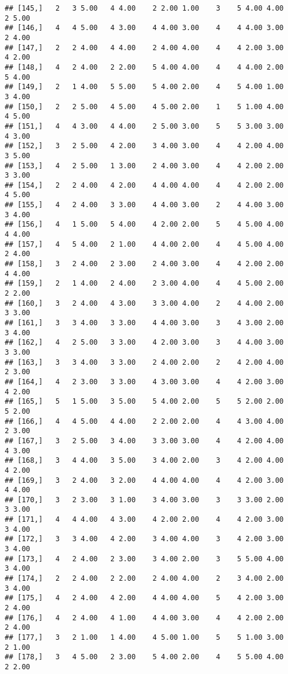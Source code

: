 \documentclass[]{article}
\begin{document}
\begin{verbatim}
## [145,]   2   3 5.00   4 4.00    2 2.00 1.00    3    5 4.00 4.00    2 5.00
## [146,]   4   4 5.00   4 3.00    4 4.00 3.00    4    4 4.00 3.00    2 4.00
## [147,]   2   2 4.00   4 4.00    2 4.00 4.00    4    4 2.00 3.00    4 2.00
## [148,]   4   2 4.00   2 2.00    5 4.00 4.00    4    4 4.00 2.00    5 4.00
## [149,]   2   1 4.00   5 5.00    5 4.00 2.00    4    5 4.00 1.00    3 4.00
## [150,]   2   2 5.00   4 5.00    4 5.00 2.00    1    5 1.00 4.00    4 5.00
## [151,]   4   4 3.00   4 4.00    2 5.00 3.00    5    5 3.00 3.00    4 3.00
## [152,]   3   2 5.00   4 2.00    3 4.00 3.00    4    4 2.00 4.00    3 5.00
## [153,]   4   2 5.00   1 3.00    2 4.00 3.00    4    4 2.00 2.00    3 3.00
## [154,]   2   2 4.00   4 2.00    4 4.00 4.00    4    4 2.00 2.00    4 5.00
## [155,]   4   2 4.00   3 3.00    4 4.00 3.00    2    4 4.00 3.00    3 4.00
## [156,]   4   1 5.00   5 4.00    4 2.00 2.00    5    4 5.00 4.00    4 4.00
## [157,]   4   5 4.00   2 1.00    4 4.00 2.00    4    4 5.00 4.00    2 4.00
## [158,]   3   2 4.00   2 3.00    2 4.00 3.00    4    4 2.00 2.00    4 4.00
## [159,]   2   1 4.00   2 4.00    2 3.00 4.00    4    4 5.00 2.00    2 2.00
## [160,]   3   2 4.00   4 3.00    3 3.00 4.00    2    4 4.00 2.00    3 3.00
## [161,]   3   3 4.00   3 3.00    4 4.00 3.00    3    4 3.00 2.00    3 4.00
## [162,]   4   2 5.00   3 3.00    4 2.00 3.00    3    4 4.00 3.00    3 3.00
## [163,]   3   3 4.00   3 3.00    2 4.00 2.00    2    4 2.00 4.00    2 3.00
## [164,]   4   2 3.00   3 3.00    4 3.00 3.00    4    4 2.00 3.00    4 2.00
## [165,]   5   1 5.00   3 5.00    5 4.00 2.00    5    5 2.00 2.00    5 2.00
## [166,]   4   4 5.00   4 4.00    2 2.00 2.00    4    4 3.00 4.00    2 3.00
## [167,]   3   2 5.00   3 4.00    3 3.00 3.00    4    4 2.00 4.00    4 3.00
## [168,]   3   4 4.00   3 5.00    3 4.00 2.00    3    4 2.00 4.00    4 2.00
## [169,]   3   2 4.00   3 2.00    4 4.00 4.00    4    4 2.00 3.00    4 4.00
## [170,]   3   2 3.00   3 1.00    3 4.00 3.00    3    3 3.00 2.00    3 3.00
## [171,]   4   4 4.00   4 3.00    4 2.00 2.00    4    4 2.00 3.00    3 4.00
## [172,]   3   3 4.00   4 2.00    3 4.00 4.00    3    4 2.00 3.00    3 4.00
## [173,]   4   2 4.00   2 3.00    3 4.00 2.00    3    5 5.00 4.00    3 4.00
## [174,]   2   2 4.00   2 2.00    2 4.00 4.00    2    3 4.00 2.00    3 4.00
## [175,]   4   2 4.00   4 2.00    4 4.00 4.00    5    4 2.00 3.00    2 4.00
## [176,]   4   2 4.00   4 1.00    4 4.00 3.00    4    4 2.00 2.00    2 4.00
## [177,]   3   2 1.00   1 4.00    4 5.00 1.00    5    5 1.00 3.00    2 1.00
## [178,]   3   4 5.00   2 3.00    5 4.00 2.00    4    5 5.00 4.00    2 2.00

\end{verbatim}
\end{document}
